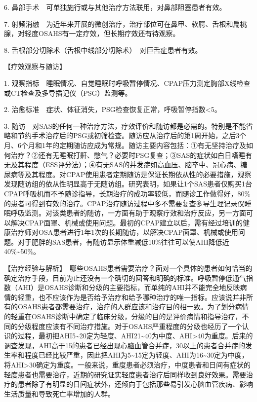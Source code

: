 6. 鼻部手术　可单独施行或与其他治疗方法联用，对鼻部阻塞患者有效。

7.
射频消融　为近年来开展的微创治疗，治疗部位可在鼻甲、软腭、舌根和扁桃腺，对轻度OSAHS有一定疗效，但长期疗效还有待观察。

8. 舌根部分切除术（舌根中线部分切除术）　对巨舌症患者有效。

【疗效观察与随访】

1.
观察指标　睡眠情况、自觉睡眠时呼吸暂停情况、CPAP压力测定胸部X线检查或CT检查及多导插记仪（PSG）监测等。

2. 治愈标准　症状、体征消失，PSG检查恢复正常，呼吸暂停指数\textless{}5。

3.
随访　对SAS的任何一种治疗方法，疗效评价和随访都是必需的。特别是不能省略和节约手术治疗后的PSG或初筛检查。随访应从治疗后的第1周开始，之后3个月、6个月和1年的定期随访应成为常规。随访主要内容包括：①有无坚持治疗及如何治疗？②还有无睡眠打鼾、憋气？必要时PSG复查；③SAS的症状如白日嗜睡有无及其程度（ESS评分法）；④有无SAS的并发症如高血压、脑卒中、冠心病、糖尿病等及其程度。对CPAP使用患者定期随访是保证长期依从性的必要措施，观察发现随访组的依从性明显高于无随访组。研究表明，如果让1个SAS患者仅购买1台CPAP呼吸机而不予随诊指导，长期治疗的成功率较低，而随诊工作做得好，80\%的患者可得到有效的治疗。CPAP治疗随访过程中多不需要复查多导生理记录仪睡眠呼吸监测。对该类患者的随访，一方面有助于观察疗效和治疗反应，另一方面可以解决CPAP面罩、机械或使用问题。最初的CPAP建立以后，需有经过培训的健康治疗师对OSA患者进行1年1次的长期随访，以解决CPAP面罩、机械或使用问题。对于肥胖的SAS患者，有随访显示体重减低10\%往往可以使AHI降低近40\%\textasciitilde{}50\%。

【治疗经验与解析】　哪些OSAHS患者需要治疗？面对一个具体的患者如何恰当的确定治疗手段，目前为止还没有一个确切的回答和明确的标准。呼吸暂停低通气指数（AHI）是OSAHS诊断和分级的主要指标，而单纯的AHI并不能完全地反映病情的轻重，也不应该作为是否给予治疗和给予哪种治疗的唯一指标。应该说并非所有的OSAHS患者都需要治疗，治疗的人群应该和治疗目的相一致。为了划分病情的轻重在OSAHS诊断中确定了临床分级，分级的目的是评价病情和指导治疗，不同的分级程度应该有不同治疗措施。对于OSAHS严重程度的分级也经历了一个认识的过程，最初把AHI5\textasciitilde{}20定为轻度、AHI21\textasciitilde{}40为中度、AHI\textgreater{}40为重度。后来的调查发现，AHI高于15的患者已经出现心脑血管合并症，30以上的患者合并症的发生率和程度已经比较严重，因此把AHI为5\textasciitilde{}15定为轻度、AHI为16\textasciitilde{}30定为中度，将AHI\textgreater{}30确定为重度。一般来说，重度患者必须治疗，中度患者和日间有症状的轻度患者也需要治疗，近期的研究证实轻度患者治疗后同样收到良好效果。需要治疗的患者除了有明显的日间症状外，还倾向于包括那些易引发心脑血管疾病、影响生活质量和导致死亡率增加的人群。

